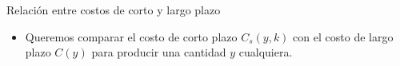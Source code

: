 \documentclass{beamer}
\theoremstyle{definition}
\begin{document}
\begin{frame}{Relaci\'on entre costos de corto y largo plazo}
\begin{itemize}

\item Queremos comparar el costo de corto plazo $C_s(y, k)$ con el costo de largo plazo $C(y)$ para producir una cantidad $y$ cualquiera.






\end{itemize}
\end{frame}
\end{document}

